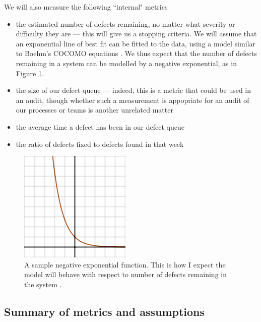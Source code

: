 We will also measure the following ``internal" metrics
\begin{itemize}
	\item the estimated number of defects remaining, no matter what severity or difficulty they are
--- this will give us a stopping criteria.
	We will assume that an exponential line of best fit can be fitted to the data, using a model
similar to Boehm's COCOMO equations \cite{boehm1984software}.
	We thus expect that the number of defects remaining in a system can be modelled by a negative
exponential, as in Figure \ref{negExp}.
	\item the size of our defect queue --- indeed, this is a metric that could be used in an audit,
though whether such a measurement is appopriate for an audit of our processes or teams is another
unrelated matter
	\item the average time a defect has been in our defect queue
	\item the ratio of defects fixed to defects found in that week
\end{itemize}

\begin{figure}[ht!]
  \centering
  \includegraphics[scale=0.75]{Exp.png}
	\caption{A sample negative exponential function. This is how I expect the
    model will behave with respect to number of defects remaining in the system
      \cite{negex}.} \label{negExp}
\end{figure}

\subsection{Summary of metrics and assumptions}


